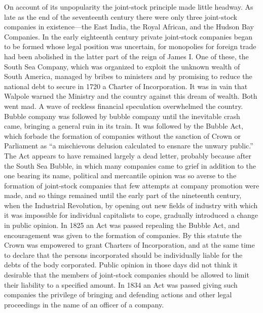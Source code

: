 \documentclass{book}
\begin{document}
On account of its unpopularity the joint-stock principle made little headway. As late as the end of the seventeenth century there were only three joint-stock companies in existence—the East India, the Royal African, and the Hudson Bay Companies. In the early eighteenth century private joint-stock companies began to be formed whose legal position was uncertain, for monopolies for foreign trade had been abolished in the latter part of the reign of James I. One of these, the South Sea Company, which was organized to exploit the unknown wealth of South America, managed by bribes to ministers and by promising to reduce the national debt to secure in 1720 a Charter of Incorporation. It was in vain that Walpole warned the Ministry and the country against this dream of wealth. Both went mad. A wave of reckless financial speculation overwhelmed the country. Bubble company was followed by bubble company until the inevitable crash came, bringing a general ruin in its train. It was followed by the Bubble Act, which forbade the formation of companies without the sanction of Crown or Parliament as “a mischievous delusion calculated to ensnare the unwary public.” The Act appears to have remained largely a dead letter, probably because after the South Sea Bubble, in which many companies came to grief in addition to the one bearing its name, political and mercantile opinion was so averse to the formation of joint-stock companies that few attempts at company promotion were made, and so things remained until the early part of the nineteenth century, when the Industrial Revolution, by opening out new fields of industry with which it was impossible for individual capitalists to cope, gradually introduced a change in public opinion. In 1825 an Act was passed repealing the Bubble Act, and encouragement was given to the formation of companies. By this statute the Crown was empowered to grant Charters of Incorporation, and at the same time to declare that the persons incorporated should be individually liable for the debts of the body corporated. Public opinion in those days did not think it desirable that the members of joint-stock companies should be allowed to limit their liability to a specified amount. In 1834 an Act was passed giving such companies the privilege of bringing and defending actions and other legal proceedings in the name of an officer of a company.
\end{document}
